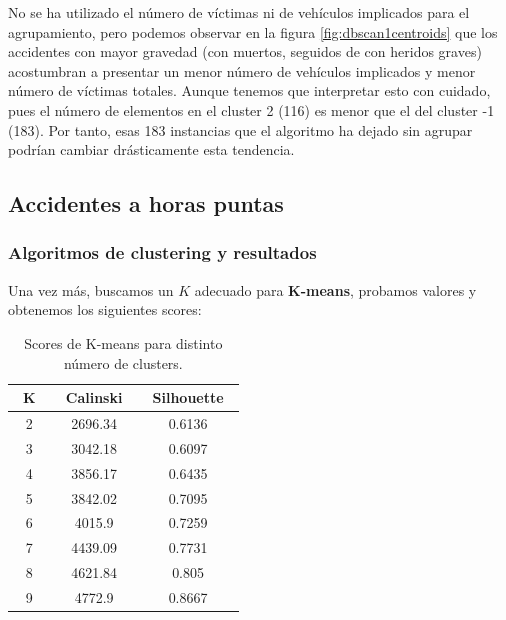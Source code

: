 \documentclass[oneside]{book}
\begin{document}
No se ha utilizado el número de víctimas ni de vehículos implicados
para el agrupamiento, pero podemos observar en la figura
\ref{fig:dbscan1centroids} que los accidentes con mayor gravedad (con
muertos, seguidos de con heridos graves) acostumbran a presentar un
menor número de vehículos implicados y menor número de víctimas
totales. Aunque tenemos que interpretar esto con cuidado, pues el
número de elementos en el cluster 2 (116) es menor que el del cluster
-1 (183). Por tanto, esas 183 instancias que el algoritmo ha dejado
sin agrupar podrían cambiar drásticamente esta tendencia.

\subsection{Accidentes a horas puntas}

\subsubsection{Algoritmos de clustering y resultados}

Una vez más, buscamos un $K$ adecuado para \textbf{K-means}, probamos
valores y obtenemos los siguientes scores:

\begin{table}[H]
  \centering
\begin{tabular}{|c|cc|}
  \hline
  ~\hspace{2mm}K\hspace{2mm}~ & ~\hspace{2mm}Calinski\hspace{2mm}~ & ~\hspace{2mm}Silhouette\hspace{2mm}~ \\ \hline
2 & 2696.34 & 0.6136 \\ \hline
3 & 3042.18 & 0.6097 \\ \hline
4 & 3856.17 & 0.6435 \\ \hline
5 & 3842.02 & 0.7095 \\ \hline
6 & 4015.9 & 0.7259 \\ \hline
7 & 4439.09 & 0.7731 \\ \hline
8 & 4621.84 & 0.805 \\ \hline
9 & 4772.9 & 0.8667 \\ \hline
\end{tabular}
\caption{Scores de K-means para distinto número de clusters.}
\label{tab:k-means22}
\end{table}
\end{document}
